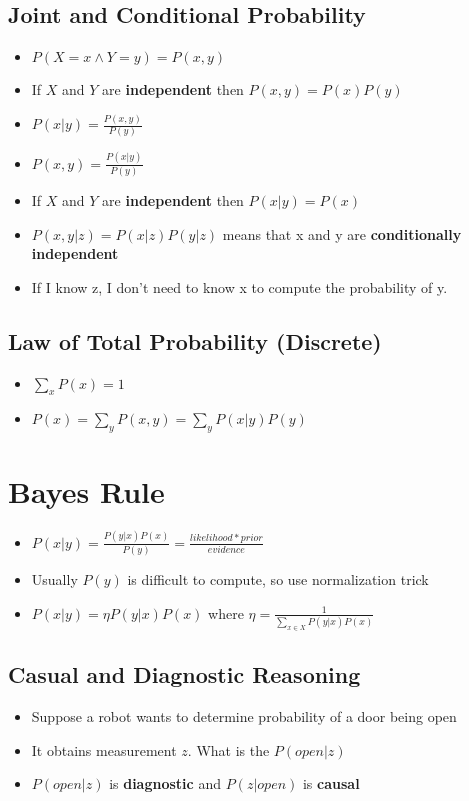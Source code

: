 \documentclass[../main.tex]{subfiles}
\begin{document}
\subsection{Joint and Conditional Probability}
    \begin{itemize}
      \item $P(X = x \wedge Y = y) = P(x, y)$
      \item If $X$ and $Y$ are \textbf{independent} then $P(x,y) = P(x)P(y)$
      \item $P(x|y) = \frac{P(x,y)}{P(y)}$
      \item $P(x,y) = \frac{P(x|y)}{P(y)}$
      \item If $X$ and $Y$ are \textbf{independent} then $P(x|y) = P(x)$
      \item $P(x,y|z) = P(x|z)P(y|z)$ means that x and y are \textbf{conditionally independent}
      \item If I know z, I don't need to know x to compute the probability of y.
    \end{itemize}

\subsection{Law of Total Probability (Discrete)}
    \begin{itemize}
      \item $\sum_{x}P(x) = 1$
      \item $P(x) = \sum_{y}P(x,y) = \sum_{y}P(x|y)P(y)$
    \end{itemize}

\section{Bayes Rule}
    \begin{itemize}
      \item $P(x|y) = \frac{P(y|x)P(x)}{P(y)} = \frac{likelihood * prior}{evidence}$
      \item Usually $P(y)$ is difficult to compute, so use normalization trick
      \item $P(x|y) = \eta P(y|x)P(x)$ where $\eta = \frac{1}{\sum_{x \in X} P(y|x)P(x)}$
    \end{itemize}

\subsection{Casual and Diagnostic Reasoning}
    \begin{itemize}
      \item Suppose a robot wants to determine probability of a door being open
      \item It obtains measurement $z$. What is the $P(open|z)$
      \item $P(open|z)$ is \textbf{diagnostic} and $P(z|open)$ is \textbf{causal}
    \end{itemize}
\end{document}

